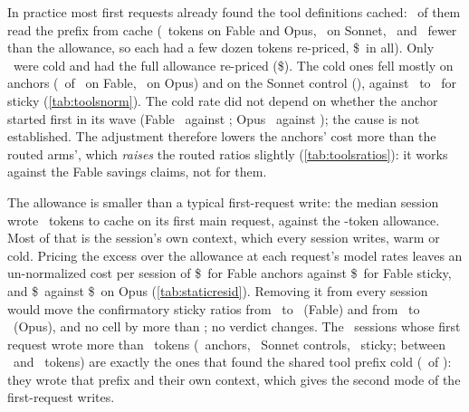 In practice most first requests already found the tool definitions cached: \RvWarmTotal\ of them read the prefix
from cache (\RvWarmReadFable\ tokens on Fable and Opus, \RvWarmReadSonnet\ on Sonnet, \RvAllowGapFable\ and \RvAllowGapSonnet\ fewer than the
allowance, so each had a few dozen tokens re-priced, \$\RvWarmUSD\ in all). Only \RvColdTotal\ were cold and had the
full allowance re-priced (\$\RvColdUSD). The cold ones fell mostly on anchors (\RvColdFableAnchor\ of \NStickyPerHost\ on Fable,
\RvColdOpusAnchor\ on Opus) and on the Sonnet control (\RvColdSonnet), against \RvColdFableSticky\ to
\RvColdOpusSticky\ for sticky (\cref{tab:toolsnorm}). The cold rate did not depend on whether the anchor started
first in its wave (Fable \RvColdFirstFable\ against \RvColdNotFirstFable; Opus \RvColdFirstOpus\ against
\RvColdNotFirstOpus); the cause is not established. The adjustment therefore lowers the anchors' cost more than the routed arms', which \emph{raises} the routed
ratios slightly (\cref{tab:toolsratios}): it works against the Fable savings claims, not for them.

The allowance is smaller than a typical first-request write: the median session wrote \RgStaticMedian\ tokens to
cache on its first main request, against the \ToolsAllowance-token allowance. Most of that is the session's own
context, which every session writes, warm or cold. Pricing the excess over the allowance at each request's model
rates leaves an un-normalized cost per session of \$\RgResidFableAnchor\ for Fable anchors against
\$\RgResidFableSticky\ for Fable sticky, and \$\RgResidOpusAnchor\ against \$\RgResidOpusSticky\ on Opus
(\cref{tab:staticresid}). Removing it from every session would move the confirmatory sticky ratios from
\CfFableStickyPair\ to \RgResidAdjFableSticky\ (Fable) and from \CfOpusStickyPair\ to \RgResidAdjOpusSticky\ (Opus),
and no cell by more than \RgResidShiftMax; no verdict changes. The \RgBigN\ sessions whose first request wrote more
than \RgBigThreshold\ tokens (\RgBigAnchors\ anchors, \RgBigSonnet\ Sonnet controls, \RgBigSticky\ sticky; between
\RgBigLow\ and \RgBigHigh\ tokens) are exactly the ones that found the shared tool prefix cold (\RgBigInCold\ of
\RgBigN): they wrote that prefix and their own context, which gives the second mode of the first-request writes.

\begin{table}[htbp]
\centering\small
\caption{Un-normalized static-write cost per session: the first main request's cache write beyond the
\ToolsAllowance-token allowance, priced at the write-minus-read rate of that request's model.}
\label{tab:staticresid}

\end{table}

